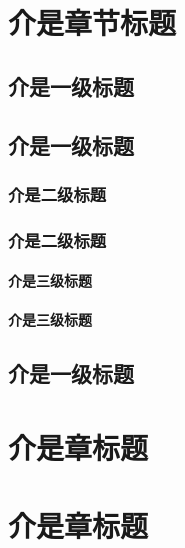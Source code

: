 \documentclass[degree = phd]{./Template/Thesis}
\begin{document}
\maketitle

\chapter{介是章节标题}
\section{介是一级标题}
\section{介是一级标题}
\subsection{介是二级标题}
\subsection{介是二级标题}
\subsubsection{介是三级标题}
\subsubsection{介是三级标题}


\section{介是一级标题}
\chapter{介是章标题}
\chapter{介是章标题}
\end{document}
